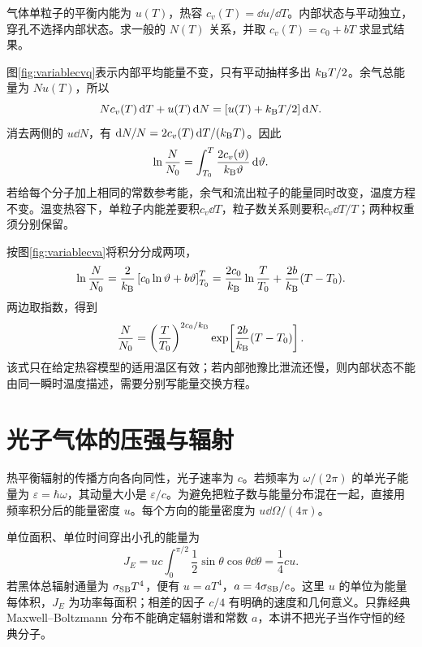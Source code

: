 \begin{example}[温变热容下的泄流]
气体单粒子的平衡内能为 $u(T)$，热容 $c_v(T)=\dd u/\dd T$。内部状态与平动独立，穿孔不选择内部状态。求一般的 $N(T)$ 关系，并取 $c_v(T)=c_0+bT$ 求显式结果。
\end{example}
\begin{solution}
图\ref{fig:variablecvq}表示内部平均能量不变，只有平动抽样多出 $k_{\mathrm B} T/2$。余气总能量为 $Nu(T)$，所以
\[
 Nc_v(T)\mathop{}\!\mathrm d T+u(T)\mathop{}\!\mathrm d N=[u(T)+k_{\mathrm B} T/2]\mathop{}\!\mathrm d N.
\]
消去两侧的 $u\dd N$，有 $\mathop{}\!\mathrm d N/N=2c_v(T)\mathop{}\!\mathrm d T/(k_{\mathrm B} T)$。因此
\[
 \ln\frac N{N_0}=\int_{T_0}^T\frac{2c_v(\vartheta)}{k_{\mathrm B}\vartheta}\mathop{}\!\mathrm d\vartheta.
\]
若给每个分子加上相同的常数参考能，余气和流出粒子的能量同时改变，温度方程不变。温变热容下，单粒子内能差要积$c_v\dd T$，粒子数关系则要积$c_v\dd T/T$；两种权重须分别保留。

按图\ref{fig:variablecva}将积分分成两项，
\[
 \ln\frac{N}{N_0}
 =\frac{2}{k_{\mathrm B}}\left[c_0\ln\vartheta+b\vartheta\right]_{T_0}^{T}
 =\frac{2c_0}{k_{\mathrm B}}\ln\frac{T}{T_0}+\frac{2b}{k_{\mathrm B}}(T-T_0).
\]
两边取指数，得到
\[
 \frac N{N_0}=\left(\frac T{T_0}\right)^{2c_0/k_{\mathrm B}}
 \exp\!\left[\frac{2b}{k_{\mathrm B}}(T-T_0)\right].
\]
该式只在给定热容模型的适用温区有效；若内部弛豫比泄流还慢，则内部状态不能由同一瞬时温度描述，需要分别写能量交换方程。
\end{solution}

\section{光子气体的压强与辐射}
\label{th:radiation}
热平衡辐射的传播方向各向同性，光子速率为 $c$。若频率为 $\omega/(2\pi)$ 的单光子能量为 $\varepsilon=\hbar\omega$，其动量大小是 $\varepsilon/c$。为避免把粒子数与能量分布混在一起，直接用频率积分后的能量密度 $u$。每个方向的能量密度为 $u\dd\Omega/(4\pi)$。

单位面积、单位时间穿出小孔的能量为
\begin{equation}\label{eq:radiationflux}
 J_E=uc\int_0^{\pi/2}\frac12\sin\theta\cos\theta\dd\theta=\frac14cu.
\end{equation}
若黑体总辐射通量为 $\sigma_{\rm SB}T^4$，便有 $u=aT^4$，$a=4\sigma_{\rm SB}/c$。这里 $u$ 的单位为能量每体积，$J_E$ 为功率每面积；相差的因子 $c/4$ 有明确的速度和几何意义。只靠经典 Maxwell--Boltzmann 分布不能确定辐射谱和常数 $a$，本讲不把光子当作守恒的经典分子。

